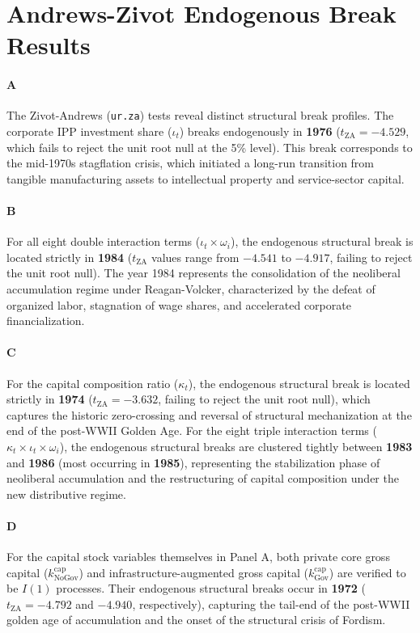 \documentclass[11pt,a4paper]{article}
\begin{document}
\FloatBarrier
\section{Andrews-Zivot Endogenous Break Results}

\paragraph{A}
The Zivot-Andrews (\texttt{ur.za}) tests reveal distinct structural break profiles. The corporate IPP investment share ($\iota_t$) breaks endogenously in \textbf{1976} ($t_{\text{ZA}} = -4.529$, which fails to reject the unit root null at the 5\% level). This break corresponds to the mid-1970s stagflation crisis, which initiated a long-run transition from tangible manufacturing assets to intellectual property and service-sector capital.

\paragraph{B}
For all eight double interaction terms ($\iota_t \times \omega_i$), the endogenous structural break is located strictly in \textbf{1984} ($t_{\text{ZA}}$ values range from $-4.541$ to $-4.917$, failing to reject the unit root null). The year 1984 represents the consolidation of the neoliberal accumulation regime under Reagan-Volcker, characterized by the defeat of organized labor, stagnation of wage shares, and accelerated corporate financialization.

\paragraph{C}
For the capital composition ratio ($\kappa_t$), the endogenous structural break is located strictly in \textbf{1974} ($t_{\text{ZA}} = -3.632$, failing to reject the unit root null), which captures the historic zero-crossing and reversal of structural mechanization at the end of the post-WWII Golden Age. For the eight triple interaction terms ($\kappa_t \times \iota_t \times \omega_i$), the endogenous structural breaks are clustered tightly between \textbf{1983} and \textbf{1986} (most occurring in \textbf{1985}), representing the stabilization phase of neoliberal accumulation and the restructuring of capital composition under the new distributive regime.

\paragraph{D}
For the capital stock variables themselves in Panel A, both private core gross capital ($k^{\text{cap}}_{\text{NoGov}}$) and infrastructure-augmented gross capital ($k^{\text{cap}}_{\text{Gov}}$) are verified to be $I(1)$ processes. Their endogenous structural breaks occur in \textbf{1972} ($t_{\text{ZA}} = -4.792$ and $-4.940$, respectively), capturing the tail-end of the post-WWII golden age of accumulation and the onset of the structural crisis of Fordism.
\end{document}
